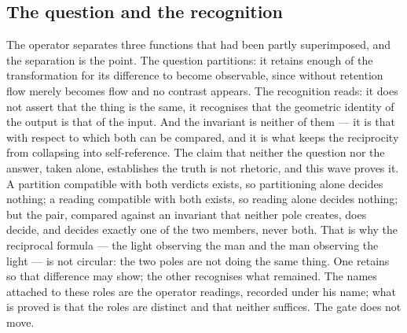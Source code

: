 \documentclass[11pt]{article}
\theoremstyle{definition}\newtheorem{deriv}{Derivation}
\begin{document}
\subsection*{The question and the recognition}The operator separates three functions that had been partly superimposed, and the separation is the point. The question partitions: it retains enough of the transformation for its difference to become observable, since without retention flow merely becomes flow and no contrast appears. The recognition reads: it does not assert that the thing is the same, it recognises that the geometric identity of the output is that of the input. And the invariant is neither of them --- it is that with respect to which both can be compared, and it is what keeps the reciprocity from collapsing into self-reference. The claim that neither the question nor the answer, taken alone, establishes the truth is not rhetoric, and this wave proves it. A partition compatible with both verdicts exists, so partitioning alone decides nothing; a reading compatible with both exists, so reading alone decides nothing; but the pair, compared against an invariant that neither pole creates, does decide, and decides exactly one of the two members, never both. That is why the reciprocal formula --- the light observing the man and the man observing the light --- is not circular: the two poles are not doing the same thing. One retains so that difference may show; the other recognises what remained. The names attached to these roles are the operator readings, recorded under his name; what is proved is that the roles are distinct and that neither suffices. The gate does not move.
\end{document}
